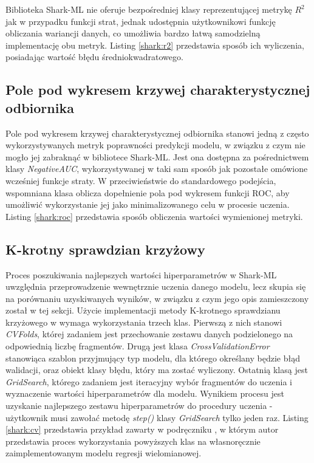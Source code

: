 Biblioteka Shark-ML nie oferuje bezpośredniej klasy reprezentującej metrykę $R^2$ jak w przypadku funkcji strat, jednak udostępnia użytkownikowi funkcję obliczania wariancji danych, co umożliwia bardzo łatwą samodzielną implementację obu metryk. Listing \ref{shark:r2} przedstawia sposób ich wyliczenia, posiadając wartość błędu średniokwadratowego.


\subsection{Pole pod wykresem krzywej charakterystycznej odbiornika}

Pole pod wykresem krzywej charakterystycznej odbiornika stanowi jedną z często wykorzystywanych metryk poprawności predykcji modelu, w związku z czym nie mogło jej zabraknąć w bibliotece Shark-ML. Jest ona dostępna za pośrednictwem klasy \textit{NegativeAUC}, wykorzystywanej w taki sam sposób jak pozostałe omówione wcześniej funkcje straty. W przeciwieństwie do standardowego podejścia, wspomniana klasa oblicza dopełnienie pola pod wykresem funkcji ROC, aby umożliwić wykorzystanie jej jako minimalizowanego celu w procesie uczenia. Listing \ref{shark:roc} przedstawia sposób obliczenia wartości wymienionej metryki.


\subsection{K-krotny sprawdzian krzyżowy}

Proces poszukiwania najlepszych wartości hiperparametrów w Shark-ML uwzględnia przeprowadzenie wewnętrznie uczenia danego modelu, lecz skupia się na porównaniu uzyskiwanych wyników, w związku z czym jego opis zamieszczony został w tej sekcji. Użycie implementacji metody K-krotnego sprawdzianu krzyżowego w wymaga wykorzystania trzech klas. Pierwszą z nich stanowi \textit{CVFolds}, której zadaniem jest przechowanie zestawu danych podzielonego na odpowiednią liczbę fragmentów. Drugą jest klasa \textit{CrossValidationError} stanowiąca szablon przyjmujący typ modelu, dla którego określany będzie błąd walidacji, oraz obiekt klasy błędu, który ma zostać wyliczony. Ostatnią klasą jest \textit{GridSearch}, którego zadaniem jest iteracyjny wybór fragmentów do uczenia i wyznaczenie wartości hiperparametrów dla modelu. Wynikiem procesu jest uzyskanie najlepszego zestawu hiperparametrów do procedury uczenia - użytkownik musi zawołać metodę \textit{step()} klasy \textit{GridSearch} tylko jeden raz. Listing \ref{shark:cv} przedstawia przykład zawarty w podręczniku \cite{handsOnMachineLearning}, w którym autor przedstawia proces wykorzystania powyższych klas na własnoręcznie zaimplementowanym modelu regresji wielomianowej. 

